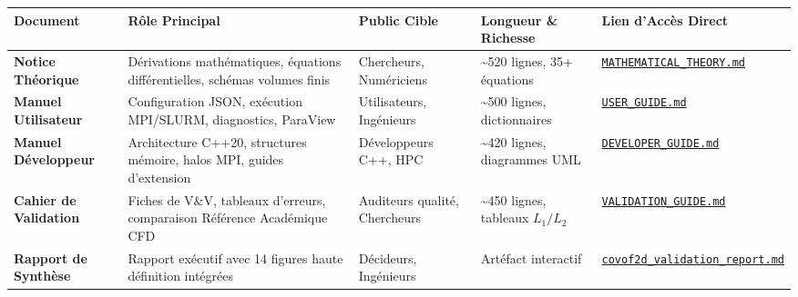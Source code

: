 \documentclass[
  french,
]{article}
\newcounter{none} %
\begin{document}
{\def\LTcaptype{none} %
\begin{longtable}[]{@{}
  >{\raggedright\arraybackslash}p{}
  >{\raggedright\arraybackslash}p{}
  >{\raggedright\arraybackslash}p{}
  >{\centering\arraybackslash}p{}
  >{\raggedright\arraybackslash}p{}@{}}
\toprule\noalign{}
\begin{minipage}[b]{\linewidth}\raggedright
Document
\end{minipage} & \begin{minipage}[b]{\linewidth}\raggedright
Rôle Principal
\end{minipage} & \begin{minipage}[b]{\linewidth}\raggedright
Public Cible
\end{minipage} & \begin{minipage}[b]{\linewidth}\centering
Longueur \& Richesse
\end{minipage} & \begin{minipage}[b]{\linewidth}\raggedright
Lien d'Accès Direct
\end{minipage} \\
\midrule\noalign{}
\endhead
\bottomrule\noalign{}
\endlastfoot
\textbf{Notice Théorique} & Dérivations mathématiques, équations
différentielles, schémas volumes finis & Chercheurs, Numériciens &
\textasciitilde520 lignes, 35+ équations &
\href{file:///Users/elhadjiibrahimathiam/Documents/PROJET_ANTIGRAVITY/COVOF_2D-FORTRAN/docs/MATHEMATICAL_THEORY.md}{\texttt{MATHEMATICAL\_THEORY.md}} \\
\textbf{Manuel Utilisateur} & Configuration JSON, exécution MPI/SLURM,
diagnostics, ParaView & Utilisateurs, Ingénieurs & \textasciitilde500
lignes, dictionnaires &
\href{file:///Users/elhadjiibrahimathiam/Documents/PROJET_ANTIGRAVITY/COVOF_2D-FORTRAN/docs/USER_GUIDE.md}{\texttt{USER\_GUIDE.md}} \\
\textbf{Manuel Développeur} & Architecture C++20, structures mémoire,
halos MPI, guides d'extension & Développeurs C++, HPC &
\textasciitilde420 lignes, diagrammes UML &
\href{file:///Users/elhadjiibrahimathiam/Documents/PROJET_ANTIGRAVITY/COVOF_2D-FORTRAN/docs/DEVELOPER_GUIDE.md}{\texttt{DEVELOPER\_GUIDE.md}} \\
\textbf{Cahier de Validation} & 13 Fiches de V\&V, tableaux d'erreurs,
comparaison Référence Académique CFD & Auditeurs qualité, Chercheurs &
\textasciitilde450 lignes, tableaux \(L_1/L_2\) &
\href{file:///Users/elhadjiibrahimathiam/Documents/PROJET_ANTIGRAVITY/COVOF_2D-FORTRAN/docs/VALIDATION_GUIDE.md}{\texttt{VALIDATION\_GUIDE.md}} \\
\textbf{Rapport de Synthèse} & Rapport exécutif avec 14 figures haute
définition intégrées & Décideurs, Ingénieurs & Artéfact interactif &
\href{file:///Users/elhadjiibrahimathiam/.gemini/antigravity/brain/d891e39d-85a0-4365-9d86-f527fe9e206c/covof2d_validation_report.md}{\texttt{covof2d\_validation\_report.md}} \\
\end{longtable}
}
\end{document}
